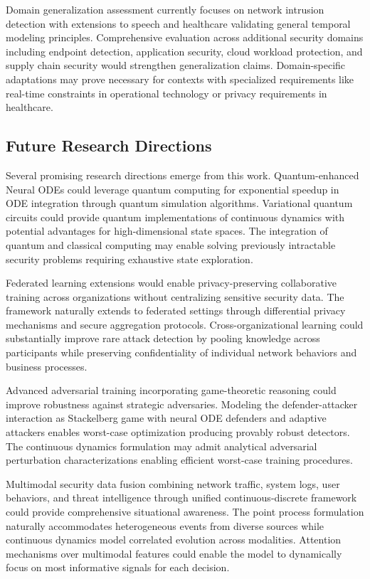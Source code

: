 \documentclass[10pt,journal,compsoc]{IEEEtran}
\begin{document}
Domain generalization assessment currently focuses on network intrusion detection with extensions to speech and healthcare validating general temporal modeling principles. Comprehensive evaluation across additional security domains including endpoint detection, application security, cloud workload protection, and supply chain security would strengthen generalization claims. Domain-specific adaptations may prove necessary for contexts with specialized requirements like real-time constraints in operational technology or privacy requirements in healthcare.

\subsection{Future Research Directions}

Several promising research directions emerge from this work. Quantum-enhanced Neural ODEs could leverage quantum computing for exponential speedup in ODE integration through quantum simulation algorithms. Variational quantum circuits could provide quantum implementations of continuous dynamics with potential advantages for high-dimensional state spaces. The integration of quantum and classical computing may enable solving previously intractable security problems requiring exhaustive state exploration.

Federated learning extensions would enable privacy-preserving collaborative training across organizations without centralizing sensitive security data. The framework naturally extends to federated settings through differential privacy mechanisms and secure aggregation protocols. Cross-organizational learning could substantially improve rare attack detection by pooling knowledge across participants while preserving confidentiality of individual network behaviors and business processes.

Advanced adversarial training incorporating game-theoretic reasoning could improve robustness against strategic adversaries. Modeling the defender-attacker interaction as Stackelberg game with neural ODE defenders and adaptive attackers enables worst-case optimization producing provably robust detectors. The continuous dynamics formulation may admit analytical adversarial perturbation characterizations enabling efficient worst-case training procedures.

Multimodal security data fusion combining network traffic, system logs, user behaviors, and threat intelligence through unified continuous-discrete framework could provide comprehensive situational awareness. The point process formulation naturally accommodates heterogeneous events from diverse sources while continuous dynamics model correlated evolution across modalities. Attention mechanisms over multimodal features could enable the model to dynamically focus on most informative signals for each decision.
\end{document}
